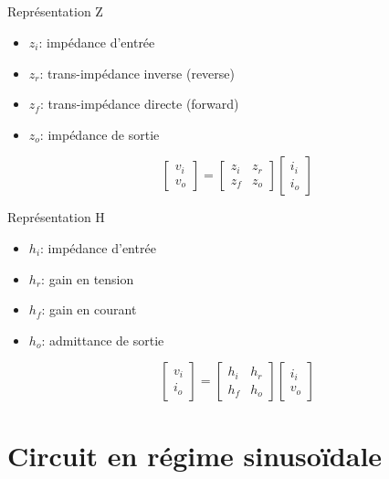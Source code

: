 \paragraph*{}
\begin{minipage}[c]{9cm}
\begin{center}Représentation Z\end{center}
\begin{itemize}
\item $z_i$: impédance d'entrée
\item $z_r$: trans-impédance inverse (reverse)
\item $z_f$: trans-impédance directe (forward)
\item $z_o$: impédance de sortie
\end{itemize}
\vspace{0.5cm}
\[
\begin{bmatrix}
v_i\\
v_o
\end{bmatrix}
=
\begin{bmatrix}
z_i & z_r\\
z_f & z_o
\end{bmatrix}
\begin{bmatrix}
i_i\\
i_o
\end{bmatrix}
\]
\end{minipage}
\begin{minipage}[c]{9cm}
\begin{center}Représentation H\end{center}
\begin{itemize}
\item $h_i$: impédance d'entrée
\item $h_r$: gain en tension
\item $h_f$: gain en courant
\item $h_o$: admittance de sortie
\end{itemize}
\vspace{0.5cm}
\[
\begin{bmatrix}
v_i\\
i_o
\end{bmatrix}
=
\begin{bmatrix}
h_i & h_r\\
h_f & h_o
\end{bmatrix}
\begin{bmatrix}
i_i\\
v_o
\end{bmatrix}
\]
\end{minipage}
\chapter{Circuit en régime sinusoïdale}
